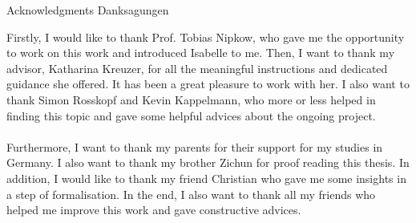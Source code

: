 \makeatletter
{}
{}
{}
\makeatother
\thispagestyle{empty}

\vspace*{20mm}

\begin{center}
\makeatletter
{}
{ Acknowledgments}
{ Danksagungen}
\makeatother
\end{center}

\vspace{10mm}

Firstly, I would like to thank Prof. Tobias Nipkow, who gave me the opportunity to work on this work 
and introduced Isabelle to me. Then, I want to thank my advisor, Katharina Kreuzer,
for all the meaningful instructions and dedicated guidance she offered. 
It has been a great pleasure to work with her. 
I also want to thank Simon Rosskopf and Kevin Kappelmann, who more or less helped in finding this topic 
and gave some helpful advices about the ongoing project. \\\\
Furthermore, I want to thank my parents for their support for my studies in Germany. 
I also want to thank my brother Zichun for proof reading this thesis. 
In addition, I would like to thank my friend Christian who gave me some insights in a step of formalisation.
In the end, I also want to thank all my friends who helped me improve this work and gave constructive advices.

\cleardoublepage{}
